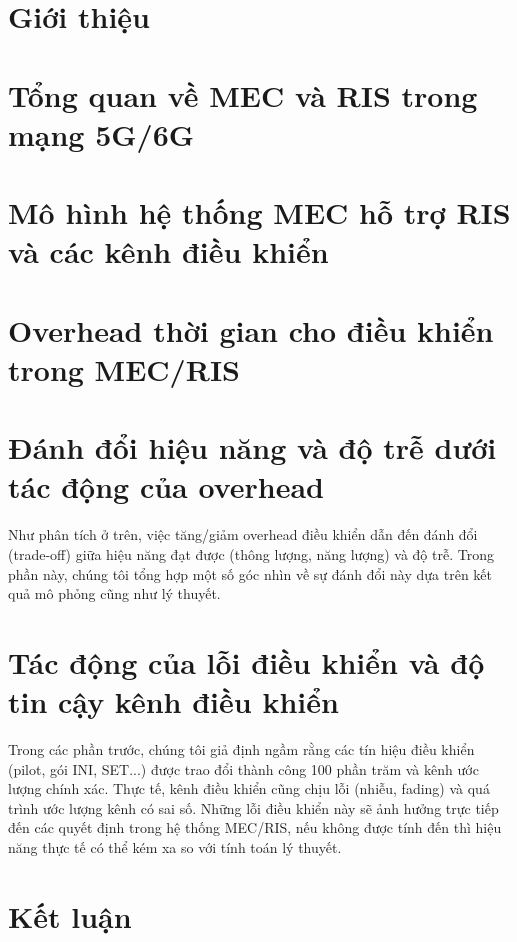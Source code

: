 \documentclass[12pt]{report}
\begin{document}
\chapter{Giới thiệu}


\chapter{Tổng quan về MEC và RIS trong mạng 5G/6G}




% 

\chapter{Mô hình hệ thống MEC hỗ trợ RIS và các kênh điều khiển}






\chapter{Overhead thời gian cho điều khiển trong MEC/RIS}




\chapter{Đánh đổi hiệu năng và độ trễ dưới tác động của overhead}
Như phân tích ở trên, việc tăng/giảm overhead điều khiển dẫn đến đánh đổi (trade-off) giữa hiệu năng đạt được (thông lượng, năng lượng) và độ trễ. Trong phần này, chúng tôi tổng hợp một số góc nhìn về sự đánh đổi này dựa trên kết quả mô phỏng cũng như lý thuyết.







\chapter{Tác động của lỗi điều khiển và độ tin cậy kênh điều khiển}
Trong các phần trước, chúng tôi giả định ngầm rằng các tín hiệu điều khiển (pilot, gói INI, SET...) được trao đổi thành công 100 phần trăm và kênh ước lượng chính xác. Thực tế, kênh điều khiển cũng chịu lỗi (nhiễu, fading) và quá trình ước lượng kênh có sai số. Những lỗi điều khiển này sẽ ảnh hưởng trực tiếp đến các quyết định trong hệ thống MEC/RIS, nếu không được tính đến thì hiệu năng thực tế có thể kém xa so với tính toán lý thuyết.




    

\chapter{Kết luận}

% 

\printbibliography[heading=bibintoc]
\end{document}
